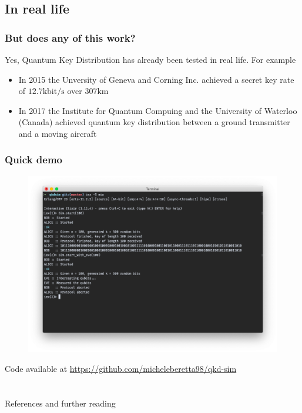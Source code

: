 \documentclass{beamer}
\begin{document}
  \subsection{In real life}
  \begin{frame}
    \frametitle{But does any of this work?}
    Yes, Quantum Key Distribution has already been tested in real life.
    For example
    \begin{itemize}
      \item In 2015 the Unversity of Geneva and Corning Inc. achieved a secret key
            rate of $12.7 \mathrm{kbit/s}$ over $307 \mathrm{km}$ \cite{qkd}
      \item In 2017 the Institute for Quantum Compuing and the University of Waterloo (Canada) achieved
            quantum key distribution between a ground transmitter and a moving aircraft \cite{airborne}
    \end{itemize}
  \end{frame}

  \begin{frame}
    \frametitle{Quick demo}
  
    \begin{center}
      \begin{figure}[H]
        \centering
        \includegraphics[width=0.8\linewidth]{qkd-bb84-elixir.png}
      \end{figure}

      \small{Code available at \url{https://github.com/micheleberetta98/qkd-sim}}
    \end{center}
  
  \end{frame}
  
  \section*{}
  \begin{frame}{References and further reading}
    \nocite{*}
    
    
  \end{frame}
\end{document}
